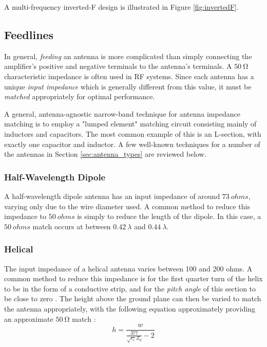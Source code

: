 A multi-frequency inverted-F design is illustrated in Figure \ref{fig:invertedF}.

\subsection{Feedlines}
In general, \textit{feeding} an antenna is more complicated than simply connecting the amplifier's positive and negative terminals to the antenna's terminals. A $\SI{50}{\ohm}$ characteristic impedance is often used in RF systems. Since each antenna has a unique \textit{input impedance} which is generally different from this value, it must be \textit{matched} appropriately for optimal performance.

A general, antenna-agnostic narrow-band technique for antenna impedance matching is to employ a "lumped element" matching circuit consisting mainly of inductors and capacitors. The most common example of this is an L-section, with exactly one capacitor and inductor. A few well-known techniques for a number of the antennas in Section \ref{sec:antenna_types} are reviewed below.

\subsubsection{Half-Wavelength Dipole}
A half-wavelength dipole antenna has an input impedance of around $\SI{73}{ohms}$, varying only due to the wire diameter used. A common method to reduce this impedance to $\SI{50}{ohms}$ is simply to reduce the length of the dipole. In this case, a $\SI{50}{ohms}$ match occurs at between $\SI{0.42}{\lambda}$ and $\SI{0.44}{\lambda}$. \cite{textbook-antennaTheoryAnalysisDesign}

\subsubsection{Helical}\label{sec:helical_matching}
The input impedance of a helical antenna varies between 100 and 200 ohms. A common method to reduce this impedance is for the first quarter turn of the helix to be in the form of a conductive strip, and for the \textit{pitch angle} of this section to be close to zero \cite{textbook-antennaTheoryAnalysisDesign}. The height above the ground plane can then be varied to match the antenna appropriately, with the following equation approximately providing an approximate $\SI{50}{\ohm}$ match \cite{textbook-antennaTheoryAnalysisDesign}:
$$h = \frac{w}{\frac{377}{\sqrt{\epsilon_r} Z_0} - 2}$$

